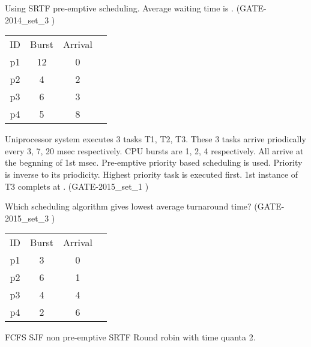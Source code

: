 \begin{minipage}{\linewidth}

  \question  Using SRTF pre-emptive scheduling. Average waiting time is \fillin[time]. (GATE-2014\_set\_3 )
      \begin{center}
      \begin{tabular}{ c c c c }
          ID & Burst & Arrival\\
          p1 & 12  & 0 \\
          p2 & 4  & 2 \\
          p3 & 6  & 3 \\
          p4 & 5  & 8 \\
      \end{tabular}
    \end{center}

  \end{minipage}

\vspace{0.08in}


\begin{minipage}{\linewidth}

  \question  Uniprocessor system executes 3 tasks T1, T2, T3. These 3 tasks arrive priodically every 3, 7, 20 msec respectively.
            CPU bursts are 1, 2, 4 respectively. All arrive at the begnning of 1st msec. Pre-emptive priority based scheduling
            is used. Priority is inverse to its priodicity. Highest priority task is executed first.
            1st instance of T3 complets at \fillin[time]. (GATE-2015\_set\_1 )

  \end{minipage}

\vspace{0.08in}

\begin{minipage}{\linewidth}

  \question  Which scheduling algorithm gives lowest average turnaround time? (GATE-2015\_set\_3 )
      \begin{center}
      \begin{tabular}{ c c c c }
          ID & Burst & Arrival\\
          p1 & 3  & 0 \\
          p2 & 6  & 1 \\
          p3 & 4  & 4 \\
          p4 & 2  & 6 \\
      \end{tabular}
    \end{center}

  \begin{choices}
    \choice FCFS
    \choice SJF non pre-emptive
    \choice SRTF
    \choice Round robin with time quanta 2.
  \end{choices}

  \end{minipage}

